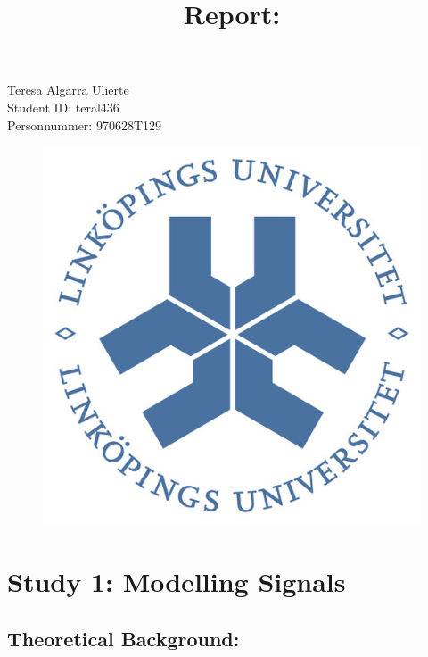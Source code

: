 \documentclass[a4paper,11pt]{article}
\title{\bfseries Report:\\}
\date{}
\begin{document}
\renewcommand\contentsname{\vspace{-1cm}}
\maketitle

\begin{centering}
    Teresa Algarra Ulierte \\
    Student ID: teral436 \\
    Personnummer: 970628T129 \\
\end{centering}

\vspace{1cm}

\begin{figure}[!ht]
	\centering
	\includegraphics[scale = 0.5]{images/portada.jpeg}
\end{figure}

\newpage

\section{Study 1: Modelling Signals}


\subsection{Theoretical Background:}
\end{document}
